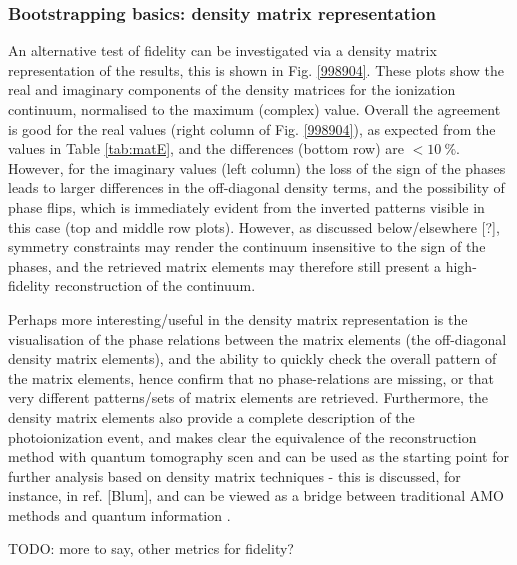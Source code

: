 \subsubsection{Bootstrapping basics: density matrix representation}

An alternative test of fidelity can be investigated via a density matrix representation of the results, this is shown in Fig. \ref{998904}. These plots show the real and imaginary components of the density matrices for the ionization continuum, normalised to the maximum (complex) value. Overall the agreement is good for the real values (right column of Fig. \ref{998904}), as expected from the values in Table \ref{tab:matE}, and the differences (bottom row) are $<10~\%$. However, for the imaginary values (left column) the loss of the sign of the phases leads to larger differences in the off-diagonal density terms, and the possibility of phase flips, which is immediately evident from the inverted patterns visible in this case (top and middle row plots). However, as discussed below/elsewhere [?], symmetry constraints may render the continuum insensitive to the sign of the phases, and the retrieved matrix elements may therefore still present a high-fidelity reconstruction of the continuum.

Perhaps more interesting/useful in the density matrix representation is the visualisation of the phase relations between the matrix elements (the off-diagonal density matrix elements), and the ability to quickly check the overall pattern of the matrix elements, hence confirm that no phase-relations are missing, or that very different patterns/sets of matrix elements are retrieved. Furthermore, the density matrix elements also provide a complete description of the photoionization event, and makes clear the equivalence of the reconstruction method with quantum tomography scen
and can be used as the starting point for further analysis based on density matrix techniques - this is discussed, for instance, in ref. [Blum], and can be viewed as a bridge between traditional AMO methods and quantum information .

TODO: more to say, other metrics for fidelity?
